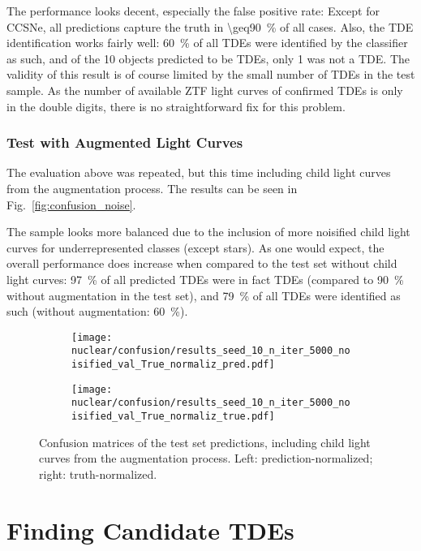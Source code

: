 The performance looks decent, especially the false positive rate: Except for CCSNe, all predictions capture the truth in \SI{\geq90}{\percent} of all cases. Also, the TDE identification works fairly well: \SI{60}{\percent} of all TDEs were identified by the classifier as such, and of the 10 objects predicted to be TDEs, only 1 was not a TDE. The validity of this result is of course limited by the small number of TDEs in the test sample. As the number of available ZTF light curves of confirmed TDEs is only in the double digits, there is no straightforward fix for this problem.

\subsubsection{Test with Augmented Light Curves}
The evaluation above was repeated, but this time including child light curves from the augmentation process. The results can be seen in Fig.~\ref{fig:confusion_noise}.

The sample looks more balanced due to the inclusion of more noisified child light curves for underrepresented classes (except stars). As one would expect, the overall performance does increase when compared to the test set without child light curves: \SI{97}{\percent} of all predicted TDEs were in fact TDEs (compared to \SI{90}{\percent} without augmentation in the test set), and \SI{79}{\percent} of all TDEs were identified as such (without augmentation: \SI{60}{\percent}).

\begin{figure}[htb]
  \centering
  \begin{subfigure}[b]{0.49\textwidth}
    \centering
    \texttt{[image: nuclear/confusion/results\_seed\_10\_n\_iter\_5000\_noisified\_val\_True\_normaliz\_pred.pdf]}
  \end{subfigure}
  \begin{subfigure}[b]{0.49\textwidth}
    \centering
    \texttt{[image: nuclear/confusion/results\_seed\_10\_n\_iter\_5000\_noisified\_val\_True\_normaliz\_true.pdf]}
  \end{subfigure}
  \caption[Confusion matrices with augmentation]{Confusion matrices of the test set predictions, including child light curves from the augmentation process. Left: prediction-normalized; right: truth-normalized.}
\end{figure}


\section{Finding Candidate TDEs}\label{visual_cuts}

